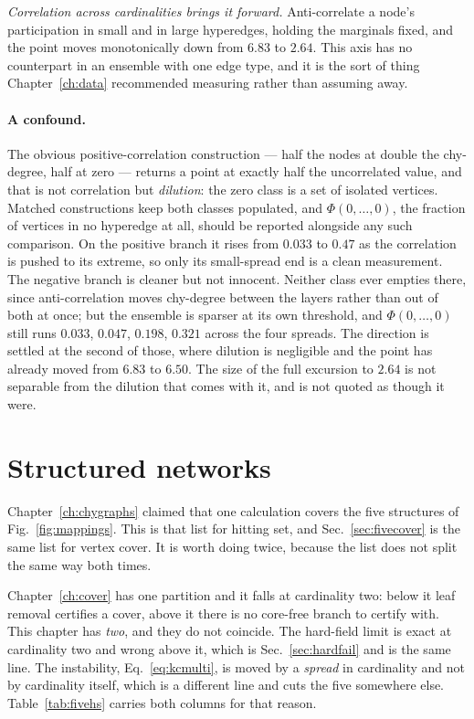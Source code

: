 \emph{Correlation across cardinalities brings it forward.} Anti-correlate a
node's participation in small and in large hyperedges, holding the marginals
fixed, and the point moves monotonically down from $6.83$ to $2.64$. This axis has no counterpart
in an ensemble with one edge type, and it is the sort of thing
Chapter~\ref{ch:data} recommended measuring rather than assuming away.

\paragraph{A confound.} The obvious positive-correlation
construction --- half the nodes at double the chy-degree, half at zero ---
returns a point at exactly half the uncorrelated value, and that is not
correlation but \emph{dilution}: the zero class is a set of isolated vertices.
Matched constructions keep both classes populated, and $\Phi(0,\dots,0)$, the
fraction of vertices in no hyperedge at all, should be reported alongside any
such comparison. On the positive branch it rises from $0.033$ to $0.47$ as the
correlation is pushed to its extreme, so only its small-spread end is a clean
measurement. The negative branch is cleaner but not innocent. Neither class ever
empties there, since anti-correlation moves chy-degree between the layers rather
than out of both at once; but the ensemble is sparser at its own threshold, and
$\Phi(0,\dots,0)$ still runs $0.033$, $0.047$, $0.198$, $0.321$ across the four
spreads. The direction is settled at the second of those, where dilution is
negligible and the point has already moved from $6.83$ to $6.50$. The size of
the full excursion to $2.64$ is not separable from the dilution that comes with
it, and is not quoted as though it were.

\section{Structured networks}
\label{sec:hsfive}

Chapter~\ref{ch:chygraphs} claimed that one calculation covers the five
structures of Fig.~\ref{fig:mappings}. This is that list for hitting set, and
Sec.~\ref{sec:fivecover} is the same list for vertex cover. It is worth doing
twice, because the list does not split the same way both times.

Chapter~\ref{ch:cover} has one partition and it falls at cardinality two: below
it leaf removal certifies a cover, above it there is no core-free branch to
certify with. This chapter has \emph{two}, and they do not coincide. The
hard-field limit is exact at cardinality two and wrong above it, which is
Sec.~\ref{sec:hardfail} and is the same line. The instability,
Eq.~\eqref{eq:kcmulti}, is moved by a \emph{spread} in cardinality and not by
cardinality itself, which is a different line and cuts the five somewhere else.
Table~\ref{tab:fivehs} carries both columns for that reason.

